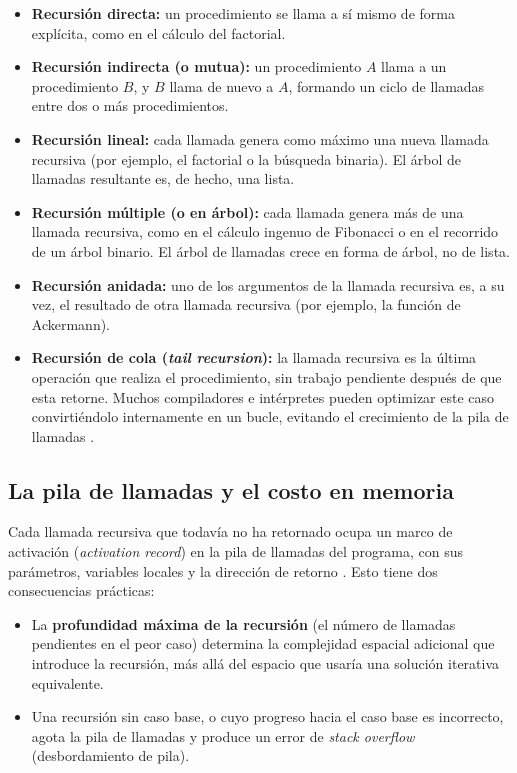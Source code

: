 \documentclass{article}
\begin{document}
\begin{itemize}
  \item \textbf{Recursión directa:} un procedimiento se llama a sí mismo de
        forma explícita, como en el cálculo del factorial.
  \item \textbf{Recursión indirecta (o mutua):} un procedimiento $A$ llama a
        un procedimiento $B$, y $B$ llama de nuevo a $A$, formando un ciclo
        de llamadas entre dos o más procedimientos.
  \item \textbf{Recursión lineal:} cada llamada genera como máximo una nueva
        llamada recursiva (por ejemplo, el factorial o la búsqueda binaria).
        El árbol de llamadas resultante es, de hecho, una lista.
  \item \textbf{Recursión múltiple (o en árbol):} cada llamada genera más de
        una llamada recursiva, como en el cálculo ingenuo de Fibonacci o en
        el recorrido de un árbol binario. El árbol de llamadas crece en
        forma de árbol, no de lista.
  \item \textbf{Recursión anidada:} uno de los argumentos de la llamada
        recursiva es, a su vez, el resultado de otra llamada recursiva (por
        ejemplo, la función de Ackermann).
  \item \textbf{Recursión de cola (\emph{tail recursion}):} la llamada
        recursiva es la última operación que realiza el procedimiento, sin
        trabajo pendiente después de que esta retorne. Muchos compiladores e
        intérpretes pueden optimizar este caso convirtiéndolo internamente
        en un bucle, evitando el crecimiento de la pila de llamadas
            \citep{brassardbratley1996}.
\end{itemize}
 
\subsection{La pila de llamadas y el costo en memoria}
 
Cada llamada recursiva que todavía no ha retornado ocupa un marco de
activación (\emph{activation record}) en la pila de llamadas del programa,
con sus parámetros, variables locales y la dirección de retorno
\citep{clrs}. Esto tiene dos consecuencias prácticas:
 
\begin{itemize}
  \item La \textbf{profundidad máxima de la recursión} (el número de
        llamadas pendientes en el peor caso) determina la complejidad
        espacial adicional que introduce la recursión, más allá del espacio
        que usaría una solución iterativa equivalente.
  \item Una recursión sin caso base, o cuyo progreso hacia el caso base es
        incorrecto, agota la pila de llamadas y produce un error de
        \emph{stack overflow} (desbordamiento de pila).
\end{itemize}
 
\end{document}
